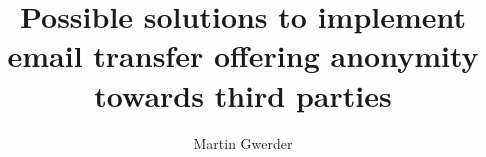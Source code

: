 \documentclass[10pt,a4paper]{book}
\title{Possible solutions to implement email transfer offering anonymity towards third parties}
\author{Martin Gwerder}
\date{\SVNDate}
\begin{document}
\frontmatter



\begin{comment}
\begin{abstracts}        %
FIXME abstract is still missing
\end{abstracts}

\begin{acknowledgements}      %
I would like to thank my wife Cornelia and my lovely three kids (Saphira, Florian and Aurelius) for their patience and their support. Without them I could never have done this work.\par

FIXME Professor\par
FIXME university\par
I would like to acknowledge the thousands of individuals who have coded for the LaTeX project for free. It is due to their efforts that we can generate professionally typeset PDFs now.
\end{acknowledgements}
\end{comment}


\tableofcontents
\listoftables
\listoffigures

\mainmatter












\end{document}

